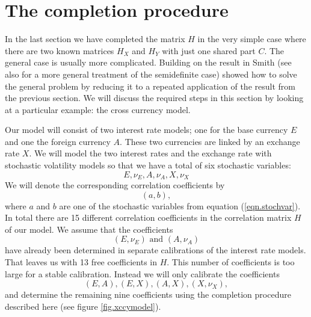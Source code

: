 \documentclass[11pt, a4paper]{article}
\begin{document}
\section{The completion procedure}\label{sec.procedure}
In the last section we have completed the matrix $H$ in the very simple case where there are two known matrices $H_X$ and $H_Y$ with just one shared part $C$. The general case is usually more complicated. Building on the result in \cite{grone} Smith \cite{smith} (see also \cite{ksd} for a more general treatment of the semidefinite case) showed how to solve the general problem by reducing it to a repeated application of the result from the previous section. We will discuss the required steps in this section by looking at a particular example: the cross currency model.

Our model will consist of two interest rate models; one for the base currency $E$ and one the foreign currency $A$. These two currencies are linked by an exchange rate $X$. We will model the two interest rates and the exchange rate with stochastic volatility models so that we have a total of six stochastic variables:
\begin{equation}\label{eqn.stochvar}
	E, \nu_E, A, \nu_A, X, \nu_X
\end{equation}
We will denote the corresponding correlation coefficients by 
\begin{equation}
	(a,b),
\end{equation}
where $a$ and $b$ are one of the stochastic variables from equation (\ref{eqn.stochvar}). In total there are 15 different correlation coefficients in the correlation matrix $H$ of our model. We assume that the coefficients 
\begin{equation}
	(E,\nu_E)\text{\ and\ }(A,\nu_A)
\end{equation}
have already been determined in separate calibrations of the interest rate models. That leaves us with 13 free coefficients in $H$. This number of coefficients is too large for a stable calibration. Instead we will only calibrate the coefficients
\begin{equation}
	(E,A), (E,X), (A,X),(X,\nu_X),
\end{equation}
and determine the remaining nine coefficients using the completion procedure described here (see figure \ref{fig.xccymodel}).
\end{document}
